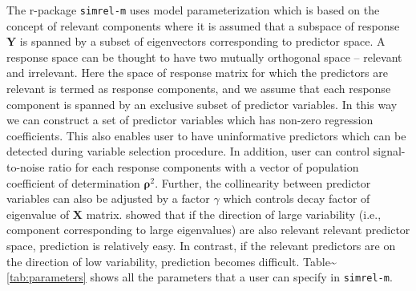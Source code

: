 \documentclass[12pt,A4paper,authoryear]{elsarticle} %
\begin{document}
The r-package \texttt{simrel-m} uses model parameterization which is
based on the concept of relevant components
\citet{helland1994comparison} where it is assumed that a subspace of
response \(\mathbf{Y}\) is spanned by a subset of eigenvectors
corresponding to predictor space. A response space can be thought to
have two mutually orthogonal space -- relevant and irrelevant. Here the
space of response matrix for which the predictors are relevant is termed
as response components, and we assume that each response component is
spanned by an exclusive subset of predictor variables. In this way we
can construct a set of predictor variables which has non-zero regression
coefficients. This also enables user to have uninformative predictors
which can be detected during variable selection procedure. In addition,
user can control signal-to-noise ratio for each response components with
a vector of population coefficient of determination
\(\boldsymbol{\rho}^2\). Further, the collinearity between predictor
variables can also be adjusted by a factor \(\gamma\) which controls
decay factor of eigenvalue of \(\mathbf{X}\) matrix.
\citet{helland1994comparison} showed that if the direction of large
variability (i.e., component corresponding to large eigenvalues) are
also relevant relevant predictor space, prediction is relatively easy.
In contrast, if the relevant predictors are on the direction of low
variability, prediction becomes difficult.
Table\textasciitilde{}\ref{tab:parameters} shows all the parameters that
a user can specify in \texttt{simrel-m}.
\end{document}
